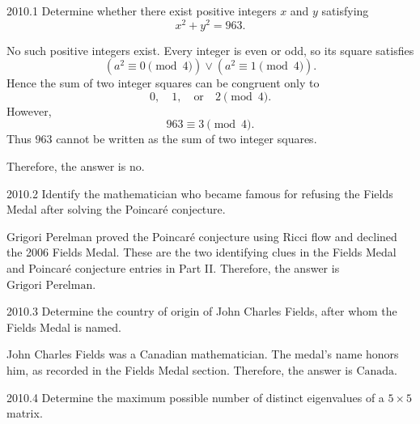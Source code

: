     \begin{pastproblem}{2010.1}
        Determine whether there exist positive integers $x$ and $y$ satisfying
        \[
            x^2+y^2=963.
        \]
    \end{pastproblem}

    \begin{solution}
        No such positive integers exist. Every integer is even or odd, so its square satisfies
        \[
            (a^2\equiv 0\pmod{4})\lor(a^2\equiv 1\pmod{4}).
        \]
        Hence the sum of two integer squares can be congruent only to
        \[
            0,\quad 1,\quad \text{or}\quad 2\pmod{4}.
        \]
        However,
        \[
            963\equiv 3\pmod{4}.
        \]
        Thus $963$ cannot be written as the sum of two integer squares.

        Therefore, the answer is $\boxed{\text{no}}$.
    \end{solution}

    \begin{pastproblem}{2010.2}
        Identify the mathematician who became famous for refusing the Fields Medal after solving the
        Poincar\'e conjecture.
    \end{pastproblem}

    \begin{solution}
Grigori Perelman proved the Poincar\'e conjecture using Ricci flow
        and declined the 2006 Fields Medal. These are the two identifying clues
        in the Fields Medal and Poincar\'e conjecture entries in Part II.
        Therefore, the answer is $\boxed{\text{Grigori Perelman}}$.
    \end{solution}

    \begin{pastproblem}{2010.3}
        Determine the country of origin of John Charles Fields, after whom the Fields Medal is
        named.
    \end{pastproblem}

    \begin{solution}
John Charles Fields was a Canadian mathematician. The medal's name
        honors him, as recorded in the Fields Medal section.
        Therefore, the answer is $\boxed{\text{Canada}}$.
    \end{solution}

    \begin{pastproblem}{2010.4}
        Determine the maximum possible number of distinct eigenvalues of a $5\times 5$ matrix.
    \end{pastproblem}

